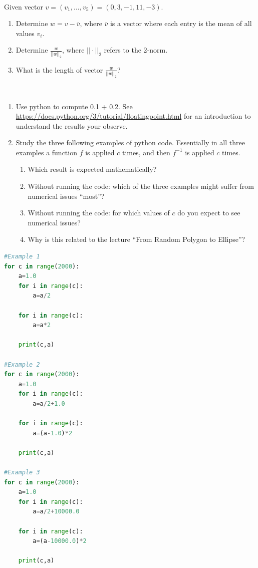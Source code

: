 \documentclass[10pt]{article}
\begin{document}
\\
 Given vector $v=(v_1, \ldots, v_5) = (0,3,-1,11,-3)$.
\begin{enumerate}
\item Determine $w=v-\overline{v}$, where $\overline{v}$ is a
  vector where each entry is the mean of all values $v_i$.
\item Determine $\frac{w}{||w||_2}$, where $||\cdot||_2$ refers to the 2-norm.
\item What is the length of vector $\frac{w}{||w||_2}$?
\end{enumerate}

\\
\begin{enumerate}
\item Use python to compute 0.1 + 0.2. See\\
  \url{https://docs.python.org/3/tutorial/floatingpoint.html} 
  for an
  introduction to understand the results your observe.
\item Study the three following examples of python code. Essentially in all
three examples a function $f$ is applied $c$ times, and then $f^{-1}$
is applied $c$ times.
\begin{enumerate}
\item Which result is expected mathematically?
\item Without running the code: which of the three examples might
  suffer from numerical issues ``most''?
\item Without running the code: for which values of $c$ do you expect
  to see numerical issues? 
\item Why is this related to the lecture ``From Random
  Polygon to Ellipse''?
\end{enumerate}
\end{enumerate}
\newpage
\begin{lstlisting}[language=Python]
#Example 1
for c in range(2000):
    a=1.0
    for i in range(c):
        a=a/2
    
    for i in range(c):
        a=a*2
    
    print(c,a)

#Example 2
for c in range(2000):
    a=1.0
    for i in range(c):
        a=a/2+1.0
    
    for i in range(c):
        a=(a-1.0)*2
    
    print(c,a)

#Example 3
for c in range(2000):
    a=1.0
    for i in range(c):
        a=a/2+10000.0
    
    for i in range(c):
        a=(a-10000.0)*2
    
    print(c,a)
\end{lstlisting}
\end{document}
